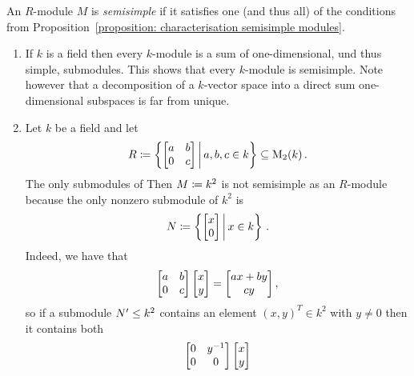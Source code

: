 \begin{definition}
  An $R$-module $M$ is \emph{semisimple} if it satisfies one (and thus all) of the conditions from Proposition~\ref{proposition: characterisation semisimple modules}.
\end{definition}


\begin{example}
  \label{example: semisimple modules}
  \leavevmode
  \begin{enumerate}
    \item
      \label{enumerate: vector spaces are semisimple}
      If $k$ is a field then every $k$-module is a sum of one-dimensional, und thus simple, submodules.
      This shows that every $k$-module is semisimple.
      Note however that a decomposition of a $k$-vector space into a direct sum one-dimensional subspaces is far from unique.
    \item
      Let $k$ be a field and let
      \[
                  R
        \defined  \left\{
                    \begin{bmatrix}
                      a & b \\
                      0 & c
                    \end{bmatrix}
                    \suchthat*
                    a, b, c \in k
                  \right\}
        \subseteq \Mat_2(k) \,.
      \]
      The only submodules of 
      Then $M \coloneqq k^2$ is not semisimple as an $R$-module because the only nonzero submodule of $k^2$ is
      \[
                  N
        \defined  \left\{
                    \vect{x \\ 0}
                  \suchthat*
                    x \in k
                  \right\} \,.
      \]
      Indeed, we have that
      \[
          \begin{bmatrix}
            a & b \\
            0 & c
          \end{bmatrix}
          \begin{bmatrix}x \\ y\end{bmatrix}
        = \begin{bmatrix}ax + by \\ cy\end{bmatrix},
      \]
      so if a submodule $N' \leq k^2$ contains an element $(x,y)^T \in k^2$ with $y \neq 0$ then it contains both
      \begin{align*}
            \begin{bmatrix}
              0 & y^{-1} \\
              0 & 0
            \end{bmatrix}
            \vect{x \\ y}

\end{align*}
\end{enumerate}
\end{example}
